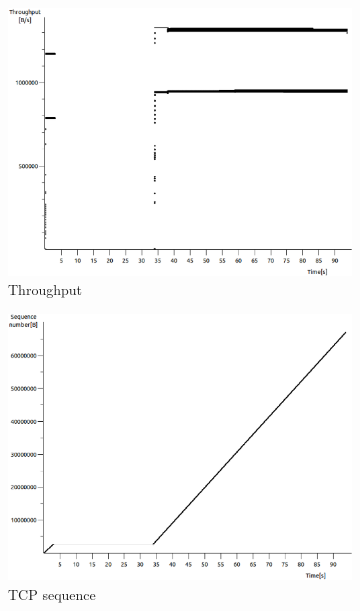 \documentclass[conference,a4paper]{IEEEtran}
\begin{document}
\begin{figure}
 \centering
 \begin{subfigure}[b]{0.2\textwidth}
  \includegraphics[width=\textwidth]{s6-0_th}
  \caption{Throughput}
 \end{subfigure}
 \begin{subfigure}[b]{0.2\textwidth}
  \includegraphics[width=\textwidth]{s6-0_seq}
  \caption{TCP sequence}
 \end{subfigure}
 \begin{subfigure}[b]{0.2\textwidth}

\end{subfigure}
\end{figure}
\end{document}
